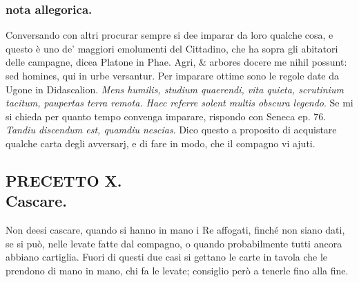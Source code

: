 \documentclass[11pt,a6paper]{article}
\begin{document}
\subsubsection{nota allegorica.}
{\footnotesize
Conversando con altri procurar sempre si dee
imparar da loro qualche cosa, e questo è uno de'
maggiori emolumenti del Cittadino, che ha sopra
gli abitatori delle campagne, dicea Platone in Phae.
Agri, \& arbores docere me nihil possunt: sed homines,
qui in urbe versantur. Per imparare ottime
sono le regole date da Ugone in Didascalion. \textit{Mens
humilis, studium quaerendi, vita quieta, scrutinium
tacitum, paupertas terra remota. Haec referre
solent multis obscura legendo}. Se mi si chieda
per quanto tempo convenga imparare, rispondo
con Seneca ep. 76. \textit{Tandiu discendum est, quamdiu
 nescias}. Dico questo a proposito di acquistare
qualche carta degli avversarj, e di fare in modo, che il
compagno vi ajuti. }

\subsection{PRECETTO X.\\
 \footnotesize Cascare.}

Non deesi cascare, quando si hanno in
mano i Re affogati, finché non siano
dati, se si può, nelle levate fatte dal
compagno, o quando probabilmente tutti ancora
abbiano cartiglia. Fuori di questi due casi si
gettano le carte in tavola che le prendono di
mano in mano, chi fa le levate; consiglio però
a tenerle fino alla fine.
\end{document}

